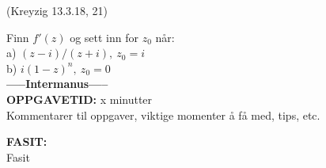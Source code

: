 \documentclass[a4paper,norsk,11pt]{style_interaktiv}
\begin{document}

\begin{oppgave}{3}
(Kreyzig 13.3.18, 21)

Finn $f'(z)$ og sett inn for $z_0$ når:\\
a) $(z - i) / (z + i) ,\ z_0 = i$\\
b) $i (1 - z)^n,\ z_0 = 0$\\

\if{}
\textbf{-----Intermanus-----}\\
\textbf{OPPGAVETID: } x minutter\\
Kommentarer til oppgaver, viktige momenter å få med, tips, etc.

\textbf{FASIT: }\\
Fasit
\fi
\end{oppgave}

\end{document}
